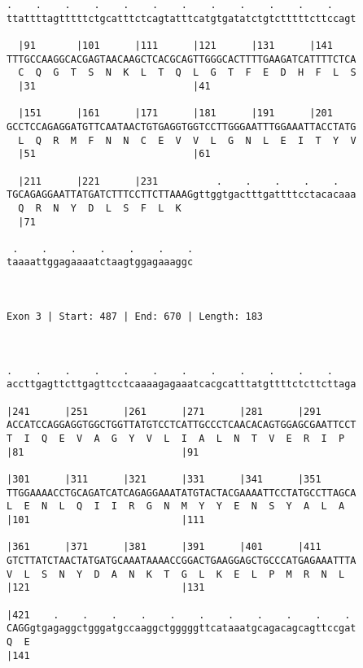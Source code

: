 \documentclass{article}
\begin{document}
{\begin{Verbatim}
.    .    .    .    .    .    .    .    .    .    .    .    
ttattttagtttttctgcatttctcagtatttcatgtgatatctgtctttttcttccagt
                                                            
  |91       |101      |111      |121      |131      |141    
TTTGCCAAGGCACGAGTAACAAGCTCACGCAGTTGGGCACTTTTGAAGATCATTTTCTCA
  C  Q  G  T  S  N  K  L  T  Q  L  G  T  F  E  D  H  F  L  S
  |31                           |41                         
  
  |151      |161      |171      |181      |191      |201    
GCCTCCAGAGGATGTTCAATAACTGTGAGGTGGTCCTTGGGAATTTGGAAATTACCTATG
  L  Q  R  M  F  N  N  C  E  V  V  L  G  N  L  E  I  T  Y  V
  |51                           |61                         
  
  |211      |221      |231          .    .    .    .    .   
TGCAGAGGAATTATGATCTTTCCTTCTTAAAGgttggtgactttgattttcctacacaaa
  Q  R  N  Y  D  L  S  F  L  K                              
  |71                                                       
  
 .    .    .    .    .    .    .
taaaattggagaaaatctaagtggagaaaggc
                                
                                
 
Exon 3 | Start: 487 | End: 670 | Length: 183



.    .    .    .    .    .    .    .    .    .    .    .    
accttgagttcttgagttcctcaaaagagaaatcacgcatttatgttttctcttcttaga
                                                            
|241      |251      |261      |271      |281      |291      
ACCATCCAGGAGGTGGCTGGTTATGTCCTCATTGCCCTCAACACAGTGGAGCGAATTCCT
T  I  Q  E  V  A  G  Y  V  L  I  A  L  N  T  V  E  R  I  P  
|81                           |91                           
  
|301      |311      |321      |331      |341      |351      
TTGGAAAACCTGCAGATCATCAGAGGAAATATGTACTACGAAAATTCCTATGCCTTAGCA
L  E  N  L  Q  I  I  R  G  N  M  Y  Y  E  N  S  Y  A  L  A  
|101                          |111                          
  
|361      |371      |381      |391      |401      |411      
GTCTTATCTAACTATGATGCAAATAAAACCGGACTGAAGGAGCTGCCCATGAGAAATTTA
V  L  S  N  Y  D  A  N  K  T  G  L  K  E  L  P  M  R  N  L  
|121                          |131                          
  
|421    .    .    .    .    .    .    .    .    .    .    . 
CAGGgtgagaggctgggatgccaaggctgggggttcataaatgcagacagcagttccgat
Q  E                                                        
|141                                                        
  

\end{Verbatim}}
\end{document}
